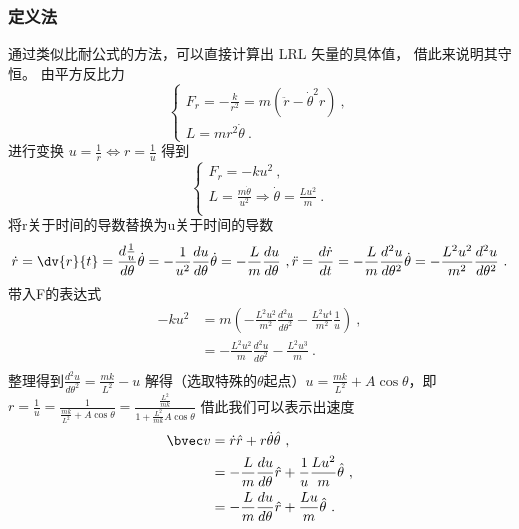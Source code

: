 \subsubsection{定义法}
通过类似比耐公式的方法，可以直接计算出 LRL 矢量的具体值， 借此来说明其守恒。 由平方反比力
\begin{equation}
\begin{cases}
F_{r}=-\frac{k}{r^{2}} = m\left(\ddot r -\dot \theta ^{2}r\right)~, \\
L = mr^{2}\dot \theta ~.
\end{cases}
\end{equation}
进行变换 $u = \frac{1}{r} \Longleftrightarrow r = \frac{1}{u}$ 得到
\begin{equation}
\begin{cases}
F_{r}= -ku^{2} ~,\\
L = \frac{m\dot \theta}{u^{2}}\Rightarrow \dot \theta = \frac{Lu^2}{m} ~.\\
\end{cases}
\end{equation}
将r关于时间的导数替换为u关于时间的导数
\begin{equation}
\dot r = \dv{r}{t}= \frac{d \frac{1}{u}}{d\theta}\dot \theta =-\frac{1}{u^{2} } \frac{du}{d\theta} \dot \theta = -\frac{L}{m}\frac{du}{d\theta}~,\\
\ddot r = \frac{d \dot r}{d t} =-\frac{L}{m} \frac{d^{2}u}{d \theta^{2}} \dot \theta = -\frac{L^{2}u^{2}}{m^{2}}\frac{d^{2}u}{d \theta^{2}}~.\\
\end{equation}
带入F的表达式
\begin{align}
-ku^{2}
&=m\left(-\frac{L^{2}u^{2}}{m^{2}}\frac{d^{2}u}{d \theta^{2}}-\frac{L^{2}u^{4}}{m^{2}}\frac{1}{u}\right)~,\\
&= -\frac{L^{2}u^{2}}{m}\frac{d^{2}u}{d \theta^{2}}-\frac{L^{2}u^{3}}{m}~.\\
\end{align}
整理得到$\frac{d^{2}u}{d\theta^{2}} = \frac{mk}{L^{2}}-u$
解得（选取特殊的$\theta$起点）$u = \frac{mk}{L^{2}} + A \cos \theta$，即$r = \frac{1}{u} = \frac{1}{\frac{mk}{L^{2}} + A \cos \theta} = \frac{\frac{L^2}{mk}}{1 + \frac{L^2}{mk} A \cos \theta}$
借此我们可以表示出速度
\begin{align}
\bvec v &= \dot r \hat r + r \dot \theta \hat \theta ~,\\
&=-\frac{L}{m}\frac{du}{d\theta} \hat r + \frac{1}{u} \frac{Lu^{2}}{m} \hat \theta ~,\\
&=-\frac{L}{m}\frac{du}{d\theta} \hat r +  \frac{Lu}{m} \hat \theta ~.\\
\end{align}
